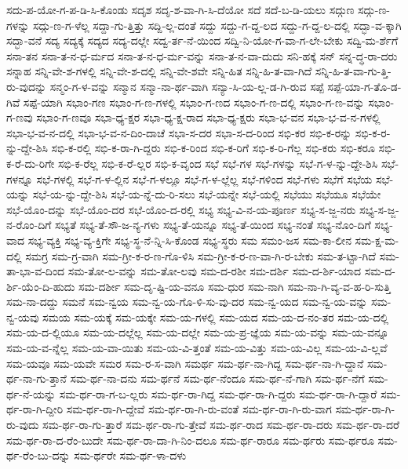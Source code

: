 {ಸದು-ಪ-ಯೋ-ಗ-ಪ-ಡಿ-ಸಿ-ಕೊಂಡು
ಸದೃಶ
ಸದೃ-ಶ-ವಾ-ಗಿ-ಸಿ-ದೆಯೋ
ಸದೆ
ಸದೆ-ಬ-ಡಿ-ಯಲು
ಸದ್ಗುಣ
ಸದ್ಗು-ಣ-ಗಳನ್ನು
ಸದ್ಗು-ಣ-ಗ-ಳೆಲ್ಲ
ಸದ್ದಾ-ಗು-ತ್ತಿತ್ತು
ಸದ್ದಿ-ಲ್ಲ-ದಂತೆ
ಸದ್ದು
ಸದ್ದು-ಗ-ದ್ದ-ಲದ
ಸದ್ದು-ಗ-ದ್ದ-ಲ-ದಲ್ಲಿ
ಸದ್ಭಾ-ವ-ಕ್ಕಾಗಿ
ಸದ್ಭಾ-ವನೆ
ಸದ್ಯ
ಸದ್ಯಕ್ಕೆ
ಸದ್ಯದ
ಸದ್ಯ-ದಲ್ಲೇ
ಸದ್ವ-ರ್ತ-ನೆ-ಯಿಂದ
ಸದ್ವಿ-ನಿ-ಯೋ-ಗ-ವಾ-ಗ-ಲೇ-ಬೇಕು
ಸದ್ವಿ-ಮ-ರ್ಶೆಗೆ
ಸನಾ-ತನ
ಸನಾ-ತ-ನ-ಧ-ರ್ಮದ
ಸನಾ-ತ-ನ-ಧ-ರ್ಮ-ವನ್ನು
ಸನಾ-ತ-ನ-ವಾ-ದುದು
ಸನಿ-ಹಕ್ಕೆ
ಸನ್
ಸನ್ನ-ದ್ಧ-ರಾ-ದರು
ಸನ್ನಾಹ
ಸನ್ನಿ-ವೇ-ಶ-ಗಳಲ್ಲಿ
ಸನ್ನಿ-ವೇ-ಶ-ದಲ್ಲಿ
ಸನ್ನಿ-ವೇ-ಶವೇ
ಸನ್ನಿ-ಹಿತ
ಸನ್ನಿ-ಹಿ-ತ-ವಾ-ಗಿದೆ
ಸನ್ನಿ-ಹಿ-ತ-ವಾ-ಗು-ತ್ತಿ-ರು-ವುದನ್ನು
ಸನ್ಮಂ-ಗ-ಳ-ವನ್ನು
ಸನ್ಮಾನ
ಸನ್ಮಾ-ನಾ-ರ್ಥ-ವಾಗಿ
ಸನ್ಯಾ-ಸಿ-ಯ-ಲ್ಲ-ಡ-ಗಿ-ರುವ
ಸಪ್ಪೆ
ಸಪ್ಪೆ-ಯಾ-ಗ-ತೊ-ಡ-ಗಿವೆ
ಸಪ್ಪೆ-ಯಾಗಿ
ಸಭಾಂ-ಗಣ
ಸಭಾಂ-ಗ-ಣ-ಗಳಲ್ಲಿ
ಸಭಾಂ-ಗ-ಣದ
ಸಭಾಂ-ಗ-ಣ-ದಲ್ಲಿ
ಸಭಾಂ-ಗ-ಣ-ವನ್ನು
ಸಭಾಂ-ಗ-ಣವು
ಸಭಾಂ-ಗ-ಣವೂ
ಸಭಾ-ಧ್ಯ-ಕ್ಷರ
ಸಭಾ-ಧ್ಯ-ಕ್ಷ-ರಾದ
ಸಭಾ-ಧ್ಯ-ಕ್ಷರು
ಸಭಾ-ಭ-ವನ
ಸಭಾ-ಭ-ವ-ನ-ಗಳಲ್ಲಿ
ಸಭಾ-ಭ-ವ-ನ-ದಲ್ಲಿ
ಸಭಾ-ಭ-ವ-ನ-ದಿಂ-ದಾಚೆ
ಸಭಾ-ಸ-ದರ
ಸಭಾ-ಸ-ದ-ರಿಂದ
ಸಭಿ-ಕರ
ಸಭಿ-ಕ-ರನ್ನು
ಸಭಿ-ಕ-ರ-ನ್ನು-ದ್ದೇ-ಶಿಸಿ
ಸಭಿ-ಕ-ರಲ್ಲಿ
ಸಭಿ-ಕ-ರಾ-ಗಿ-ದ್ದರು
ಸಭಿ-ಕ-ರಿಂದ
ಸಭಿ-ಕ-ರಿಗೆ
ಸಭಿ-ಕ-ರಿ-ಗೆಲ್ಲ
ಸಭಿ-ಕರು
ಸಭಿ-ಕರೂ
ಸಭಿ-ಕ-ರೆ-ದು-ರಿಗೇ
ಸಭಿ-ಕ-ರೆಲ್ಲ
ಸಭಿ-ಕ-ರೆ-ಲ್ಲರ
ಸಭಿ-ಕ-ವೃಂದ
ಸಭೆ
ಸಭೆ-ಗಳ
ಸಭೆ-ಗಳನ್ನು
ಸಭೆ-ಗ-ಳ-ನ್ನು-ದ್ದೇ-ಶಿಸಿ
ಸಭೆ-ಗಳನ್ನೂ
ಸಭೆ-ಗಳಲ್ಲಿ
ಸಭೆ-ಗ-ಳ-ಲ್ಲಿನ
ಸಭೆ-ಗ-ಳಲ್ಲೂ
ಸಭೆ-ಗ-ಳ-ಲ್ಲೆಲ್ಲ
ಸಭೆ-ಗಳಿಂದ
ಸಭೆ-ಗಳು
ಸಭೆಗೆ
ಸಭೆಯ
ಸಭೆ-ಯನ್ನು
ಸಭೆ-ಯ-ನ್ನು-ದ್ದೇ-ಶಿಸಿ
ಸಭೆ-ಯ-ನ್ನೆ-ದು-ರಿ-ಸಲು
ಸಭೆ-ಯನ್ನೇ
ಸಭೆ-ಯಲ್ಲಿ
ಸಭೆಯು
ಸಭೆಯೂ
ಸಭೆಯೇ
ಸಭೆ-ಯೊಂ-ದನ್ನು
ಸಭೆ-ಯೊಂ-ದರ
ಸಭೆ-ಯೊಂ-ದ-ರಲ್ಲಿ
ಸಭ್ಯ
ಸಭ್ಯ-ವಿ-ನ-ಯ-ಪೂರ್ಣ
ಸಭ್ಯ-ಸ-ಜ್ಜ-ನರು
ಸಭ್ಯ-ಸ-ಜ್ಜ-ನ-ರೊಂ-ದಿಗೆ
ಸಭ್ಯತೆ
ಸಭ್ಯ-ತೆ-ಸೌ-ಜ-ನ್ಯ-ಗಳು
ಸಭ್ಯ-ತೆ-ಯನ್ನೂ
ಸಭ್ಯ-ತೆ-ಯಿಂದ
ಸಭ್ಯ-ನಂತೆ
ಸಭ್ಯ-ನೊಂ-ದಿಗೆ
ಸಭ್ಯ-ವಾದ
ಸಭ್ಯ-ವ್ಯಕ್ತಿ
ಸಭ್ಯ-ವ್ಯ-ಕ್ತಿಗೇ
ಸಭ್ಯ-ಸ್ಥ-ನೆ-ನ್ನಿ-ಸಿ-ಕೊಂಡ
ಸಭ್ಯ-ಸ್ಥರು
ಸಮ
ಸಮಂ-ಜಸ
ಸಮ-ಕಾ-ಲೀನ
ಸಮ-ಕ್ಷ-ಮ-ದಲ್ಲಿ
ಸಮಗ್ರ
ಸಮ-ಗ್ರ-ವಾಗಿ
ಸಮ-ಗ್ರೀ-ಕ-ರ-ಣ-ಗೊ-ಳಿಸಿ
ಸಮ-ಗ್ರೀ-ಕ-ರ-ಣ-ವಾ-ಗಿ-ರ-ಬೇಕು
ಸಮ-ತ-ಟ್ಟಾ-ಗಿದೆ
ಸಮ-ತಾ-ಭಾ-ವ-ದಿಂದ
ಸಮ-ತೋ-ಲ-ವನ್ನು
ಸಮ-ತೋ-ಲವು
ಸಮ-ದ-ರಶೀ
ಸಮ-ದರ್ಶಿ
ಸಮ-ದ-ರ್ಶಿ-ಯಾದ
ಸಮ-ದ-ರ್ಶಿ-ಯೆಂ-ದಿ-ಹುದು
ಸಮ-ದರ್ಶೀ
ಸಮ-ದೃ-ಷ್ಟಿ-ಯ-ವನೂ
ಸಮ-ಧುರ
ಸಮ-ನಾಗಿ
ಸಮ-ನಾ-ಗಿ-ವ್ಯ-ವ-ಹ-ರಿ-ಸುತ್ತಿ
ಸಮ-ನಾ-ದದ್ದು
ಸಮನೆ
ಸಮ-ನ್ವಯ
ಸಮ-ನ್ವ-ಯ-ಗೊ-ಳಿ-ಸು-ವು-ದರ
ಸಮ-ನ್ವ-ಯದ
ಸಮ-ನ್ವ-ಯ-ವನ್ನು
ಸಮ-ನ್ವ-ಯವು
ಸಮಯ
ಸಮ-ಯಕ್ಕೆ
ಸಮ-ಯಕ್ಕೇ
ಸಮ-ಯ-ಗಳಲ್ಲಿ
ಸಮ-ಯದ
ಸಮ-ಯ-ದ-ನಂ-ತರ
ಸಮ-ಯ-ದಲ್ಲಿ
ಸಮ-ಯ-ದ-ಲ್ಲಿಯೂ
ಸಮ-ಯ-ದಲ್ಲೆಲ್ಲ
ಸಮ-ಯ-ದಲ್ಲೇ
ಸಮ-ಯ-ಪ್ರ-ಜ್ಞೆಯ
ಸಮ-ಯ-ವನ್ನು
ಸಮ-ಯ-ವನ್ನೂ
ಸಮ-ಯ-ವ-ನ್ನೆಲ್ಲ
ಸಮ-ಯ-ವಾ-ಯಿತು
ಸಮ-ಯ-ವಿ-ತ್ತಂತೆ
ಸಮ-ಯ-ವಿತ್ತು
ಸಮ-ಯ-ವಿಲ್ಲ
ಸಮ-ಯ-ವಿ-ಲ್ಲವೆ
ಸಮ-ಯವೂ
ಸಮ-ಯವೇ
ಸಮರ
ಸಮ-ರ-ಸ-ವಾಗಿ
ಸಮರ್ಥ
ಸಮ-ರ್ಥ-ನಾ-ಗಿದ್ದ
ಸಮ-ರ್ಥ-ನಾ-ಗಿ-ದ್ದಾನೆ
ಸಮ-ರ್ಥ-ನಾ-ಗು-ತ್ತಾನೆ
ಸಮ-ರ್ಥ-ನಾ-ದನು
ಸಮ-ರ್ಥನೆ
ಸಮ-ರ್ಥ-ನೆಂದೂ
ಸಮ-ರ್ಥ-ನೆ-ಗಾಗಿ
ಸಮ-ರ್ಥ-ನೆಗೆ
ಸಮ-ರ್ಥ-ನೆ-ಯನ್ನು
ಸಮ-ರ್ಥ-ರಾ-ಗ-ಬ-ಲ್ಲರು
ಸಮ-ರ್ಥ-ರಾ-ಗಿದ್ದ
ಸಮ-ರ್ಥ-ರಾ-ಗಿ-ದ್ದರು
ಸಮ-ರ್ಥ-ರಾ-ಗಿ-ದ್ದಾರೆ
ಸಮ-ರ್ಥ-ರಾ-ಗಿ-ದ್ದೀರಿ
ಸಮ-ರ್ಥ-ರಾ-ಗಿ-ದ್ದೇವೆ
ಸಮ-ರ್ಥ-ರಾ-ಗಿ-ರು-ವಂತೆ
ಸಮ-ರ್ಥ-ರಾ-ಗಿ-ರು-ವಾಗ
ಸಮ-ರ್ಥ-ರಾ-ಗಿ-ರು-ವುದು
ಸಮ-ರ್ಥ-ರಾ-ಗು-ತ್ತಾರೆ
ಸಮ-ರ್ಥ-ರಾ-ಗು-ತ್ತೇವೆ
ಸಮ-ರ್ಥ-ರಾದ
ಸಮ-ರ್ಥ-ರಾ-ದರು
ಸಮ-ರ್ಥ-ರಾ-ದರೆ
ಸಮ-ರ್ಥ-ರಾ-ದ-ರೆಂ-ಬುದೇ
ಸಮ-ರ್ಥ-ರಾ-ದಾ-ಗಿ-ನಿಂ-ದಲೂ
ಸಮ-ರ್ಥ-ರಾರೂ
ಸಮ-ರ್ಥರು
ಸಮ-ರ್ಥರೂ
ಸಮ-ರ್ಥ-ರೆಂ-ಬು-ದನ್ನು
ಸಮ-ರ್ಥರೇ
ಸಮ-ರ್ಥ-ಳಾ-ದಳು
}
